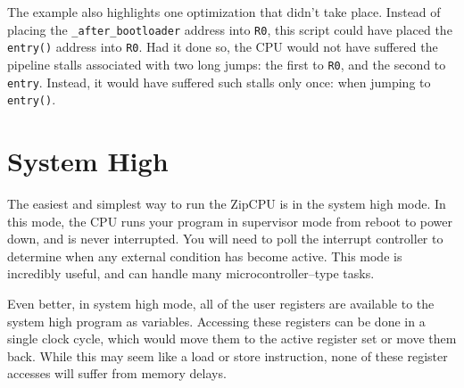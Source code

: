 \documentclass{gqtekspec}
\begin{document}
The example also highlights one optimization that didn't take place.  Instead
of placing the {\tt \_after\_bootloader} address into {\tt R0}, this script
could have placed the {\tt entry()} address into {\tt R0}.  Had it done so, the
CPU would not have suffered the pipeline stalls associated with two long jumps:
the first to {\tt R0}, and the second to {\tt entry}.  Instead, it would have
suffered such stalls only once: when jumping to {\tt entry()}.


\section{System High}
The easiest and simplest way to run the ZipCPU is in the system high mode.
In this mode, the CPU runs your program in supervisor mode from reboot to
power down, and is never interrupted.  You will need to poll the interrupt
controller to determine when any external condition has become active.  This
mode is incredibly useful, and can handle many microcontroller--type tasks. 

Even better, in system high mode, all of the user registers are available
to the system high program as variables.  Accessing these registers can be
done in a single clock cycle, which would move them to the active register
set or move them back.  While this may seem like a load or store instruction,
none of these register accesses will suffer from memory delays.
\end{document}
